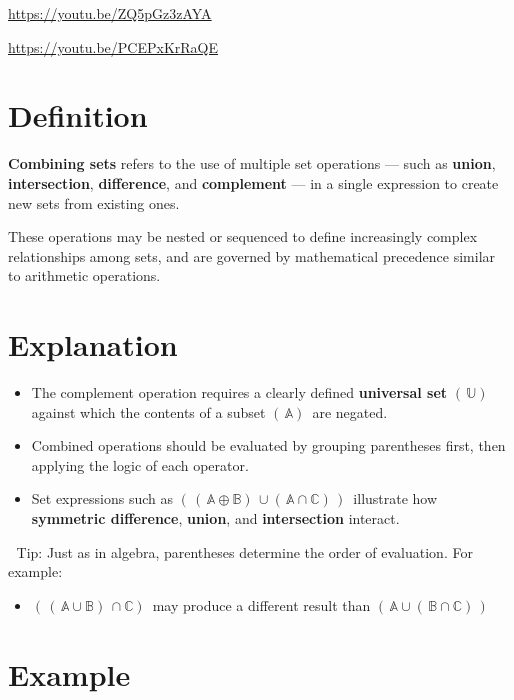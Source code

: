\documentclass[
  letterpaper,
  DIV=11,
  numbers=noendperiod]{scrreprt}
\providecommand{\tightlist}{%
  \setlength{\itemsep}{0pt}\setlength{\parskip}{0pt}}
\begin{document}
\url{https://youtu.be/ZQ5pGz3zAYA}

\url{https://youtu.be/PCEPxKrRaQE}

\section{Definition}

{\textbf{Combining sets}} refers to the use of multiple set operations
--- such as \textbf{union}, \textbf{intersection}, \textbf{difference},
and \textbf{complement} --- in a single expression to create new sets
from existing ones.

These operations may be nested or sequenced to define increasingly
complex relationships among sets, and are governed by mathematical
precedence similar to arithmetic operations.

\section{Explanation}

\begin{itemize}
\item
  The complement operation requires a clearly defined \textbf{universal
  set} \((\, \mathbb{U} )\,\) against which the contents of a subset
  \((\, \mathbb{A} )\,\) are negated.
\item
  Combined operations should be evaluated by grouping parentheses first,
  then applying the logic of each operator.
\item
  Set expressions such as
  \((\, (\, \mathbb{A} \oplus \mathbb{B})\, \cup (\, \mathbb{A} \cap \mathbb{C})\, )\,\)
  illustrate how \textbf{symmetric difference}, \textbf{union}, and
  \textbf{intersection} interact.
\end{itemize}

🧠 Tip: Just as in algebra, parentheses determine the order of
evaluation. For example:

\begin{itemize}
\tightlist
\item
  \((\, (\, \mathbb{A} \cup \mathbb{B})\, \cap \mathbb{C} )\,\) may
  produce a different result than
  \((\, \mathbb{A} \cup (\, \mathbb{B} \cap \mathbb{C})\, )\,\)
\end{itemize}

\section{Example}
\end{document}
